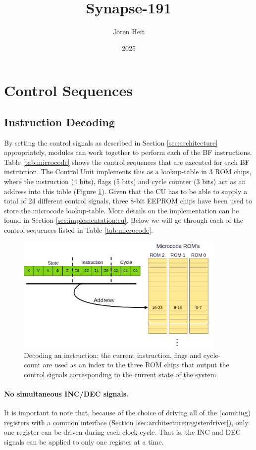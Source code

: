 \documentclass{article}
\title{Synapse-191}
\author{Joren Heit}
\date{2025}
\begin{document}
\section{Control Sequences} \label{sec:sequences}
\subsection{Instruction Decoding}
By setting the control signals as described in Section \ref{sec:architecture} appropriately, modules can work together to perform each of the BF instructions. Table \ref{tab:microcode} shows the control sequences that are executed for each BF instruction. The Control Unit implements this as a lookup-table in 3 ROM chips, where the instruction (4 bits), flags (5 bits) and cycle counter (3 bits) act as an address into this table (Figure \ref{fig:decoder}). Given that the CU has to be able to supply a total of 24 different control signals, three 8-bit EEPROM chips have been used to store the microcode lookup-table. More details on the implementation can be found in Section \ref{sec:implementation:cu}. Below we will go through each of the control-sequences listed in Table \ref{tab:microcode}.

\begin{figure}[H]
  \centering
  \includegraphics[width=0.9\textwidth]{img/instruction_decoding}
  \caption{Decoding an instruction: the current instruction, flags and cycle-count are used as an index to the three ROM chips that output the control signals corresponding to the current state of the system.}
  \label{fig:decoder}
\end{figure}

\paragraph{No simultaneous INC/DEC signals.} It is important to note that, because of the choice of driving all of the (counting) registers with a common interface (Section \ref{sec:architecture:registerdriver}), only one register can be driven during each clock cycle. That is, the INC and DEC signals can be applied to only one register at a time. 
\end{document}
